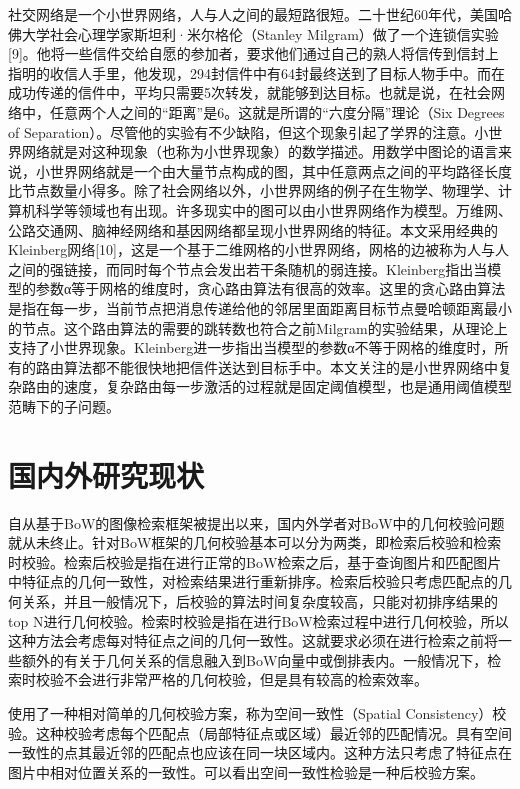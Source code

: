 社交网络是一个小世界网络，人与人之间的最短路很短。二十世纪60年代，美国哈佛大学社会心理学家斯坦利·米尔格伦（Stanley Milgram）做了一个连锁信实验[9]。他将一些信件交给自愿的参加者，要求他们通过自己的熟人将信传到信封上指明的收信人手里，他发现，294封信件中有64封最终送到了目标人物手中。而在成功传递的信件中，平均只需要5次转发，就能够到达目标。也就是说，在社会网络中，任意两个人之间的“距离”是6。这就是所谓的“六度分隔”理论（Six Degrees of Separation）。尽管他的实验有不少缺陷，但这个现象引起了学界的注意。小世界网络就是对这种现象（也称为小世界现象）的数学描述。用数学中图论的语言来说，小世界网络就是一个由大量节点构成的图，其中任意两点之间的平均路径长度比节点数量小得多。除了社会网络以外，小世界网络的例子在生物学、物理学、计算机科学等领域也有出现。许多现实中的图可以由小世界网络作为模型。万维网、公路交通网、脑神经网络和基因网络都呈现小世界网络的特征。本文采用经典的Kleinberg网络[10]，这是一个基于二维网格的小世界网络，网格的边被称为人与人之间的强链接，而同时每个节点会发出若干条随机的弱连接。Kleinberg指出当模型的参数α等于网格的维度时，贪心路由算法有很高的效率。这里的贪心路由算法是指在每一步，当前节点把消息传递给他的邻居里面距离目标节点曼哈顿距离最小的节点。这个路由算法的需要的跳转数也符合之前Milgram的实验结果，从理论上支持了小世界现象。Kleinberg进一步指出当模型的参数α不等于网格的维度时，所有的路由算法都不能很快地把信件送达到目标手中。本文关注的是小世界网络中复杂路由的速度，复杂路由每一步激活的过程就是固定阈值模型，也是通用阈值模型范畴下的子问题。


\section{国内外研究现状}
自从基于BoW的图像检索框架\cite{sivic2003video}被提出以来，国内外学者对BoW中的几何校验问题就从未终止。针对BoW框架的几何校验基本可以分为两类，即检索后校验和检索时校验。检索后校验是指在进行正常的BoW检索之后，基于查询图片和匹配图片中特征点的几何一致性，对检索结果进行重新排序。检索后校验只考虑匹配点的几何关系，并且一般情况下，后校验的算法时间复杂度较高，只能对初排序结果的top N进行几何校验。检索时校验是指在进行BoW检索过程中进行几何校验，所以这种方法会考虑每对特征点之间的几何一致性。这就要求必须在进行检索之前将一些额外的有关于几何关系的信息融入到BoW向量中或倒排表内。一般情况下，检索时校验不会进行非常严格的几何校验，但是具有较高的检索效率。

\cite{sivic2003video}使用了一种相对简单的几何校验方案，称为空间一致性（Spatial Consistency）校验。这种校验考虑每个匹配点（局部特征点或区域）最近邻的匹配情况。具有空间一致性的点其最近邻的匹配点也应该在同一块区域内。这种方法只考虑了特征点在图片中相对位置关系的一致性。可以看出空间一致性检验是一种后校验方案。

